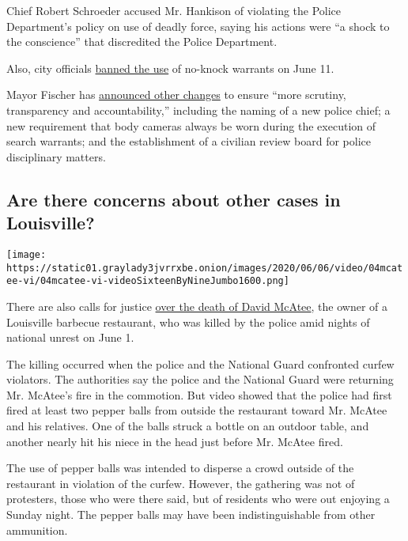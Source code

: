 Chief Robert Schroeder accused Mr. Hankison of violating the Police
Department's policy on use of deadly force, saying his actions were ``a
shock to the conscience'' that discredited the Police Department.

Also, city officials
\href{https://www.nytimes3xbfgragh.onion/2020/06/12/us/breonna-taylor-law-passed.html}{banned
the use} of no-knock warrants on June 11.

Mayor Fischer has
\href{https://www.wlky.com/article/following-protests-louisville-mayor-puts-end-to-no-knock-warrants-for-now/32711443}{announced
other changes} to ensure ``more scrutiny, transparency and
accountability,'' including the naming of a new police chief; a new
requirement that body cameras always be worn during the execution of
search warrants; and the establishment of a civilian review board for
police disciplinary matters.

\hypertarget{are-there-concerns-about-other-cases-in-louisville}{%
\subsection{Are there concerns about other cases in
Louisville?}\label{are-there-concerns-about-other-cases-in-louisville}}

\texttt{[image: https://static01.graylady3jvrrxbe.onion/images/2020/06/06/video/04mcatee-vi/04mcatee-vi-videoSixteenByNineJumbo1600.png]}

There are also calls for justice
\href{https://www.nytimes3xbfgragh.onion/2020/06/04/us/louisville-unrest-david-mcatee.html}{over
the death of David McAtee}, the owner of a Louisville barbecue
restaurant, who was killed by the police amid nights of national unrest
on June 1.

The killing occurred when the police and the National Guard confronted
curfew violators. The authorities say the police and the National Guard
were returning Mr. McAtee's fire in the commotion. But video showed that
the police had first fired at least two pepper balls from outside the
restaurant toward Mr. McAtee and his relatives. One of the balls struck
a bottle on an outdoor table, and another nearly hit his niece in the
head just before Mr. McAtee fired.

The use of pepper balls was intended to disperse a crowd outside of the
restaurant in violation of the curfew. However, the gathering was not of
protesters, those who were there said, but of residents who were out
enjoying a Sunday night. The pepper balls may have been
indistinguishable from other ammunition.

